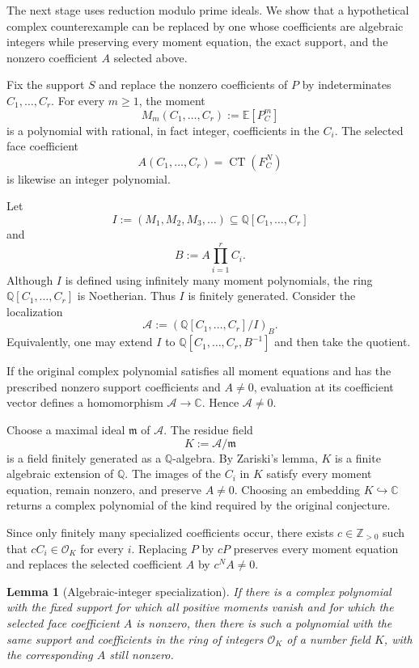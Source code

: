 \documentclass[11pt]{article}
\newtheorem{lemma}[theorem]{Lemma}
\theoremstyle{remark}
\newcommand{\E}{\mathbb E}
\newcommand{\C}{\mathbb C}
\newcommand{\Q}{\mathbb Q}
\newcommand{\Z}{\mathbb Z}
\newcommand{\CT}{\operatorname{CT}}
\begin{document}
The next stage uses reduction modulo prime ideals. We show that a hypothetical complex counterexample can be replaced by one whose coefficients are algebraic integers while preserving every moment equation, the exact support, and the nonzero coefficient $A$ selected above.

Fix the support $S$ and replace the nonzero coefficients of $P$ by indeterminates $C_1,\ldots,C_r$. For every $m\ge1$, the moment
\[
M_m(C_1,\ldots,C_r):=\E[P_C^m]
\]
is a polynomial with rational, in fact integer, coefficients in the $C_i$. The selected face coefficient
\[
A(C_1,\ldots,C_r)=\CT(F_C^N)
\]
is likewise an integer polynomial.

Let
\[
I:=(M_1,M_2,M_3,\ldots)
\subseteq
\Q[C_1,\ldots,C_r]
\]
and
\[
B:=A\prod_{i=1}^r C_i.
\]
Although $I$ is defined using infinitely many moment polynomials, the ring $\Q[C_1,\ldots,C_r]$ is Noetherian. Thus $I$ is finitely generated. Consider the localization
\begin{equation}\label{eq:localization}
\mathcal A
:=
\left(\Q[C_1,\ldots,C_r]/I\right)_B.
\end{equation}
Equivalently, one may extend $I$ to $\Q[C_1,\ldots,C_r,B^{-1}]$ and then take the quotient.

If the original complex polynomial satisfies all moment equations and has the prescribed nonzero support coefficients and $A\ne0$, evaluation at its coefficient vector defines a homomorphism $\mathcal A\to\C$. Hence $\mathcal A\ne0$.

Choose a maximal ideal $\mathfrak m$ of $\mathcal A$. The residue field
\[
K:=\mathcal A/\mathfrak m
\]
is a field finitely generated as a $\Q$-algebra. By Zariski's lemma, $K$ is a finite algebraic extension of $\Q$. The images of the $C_i$ in $K$ satisfy every moment equation, remain nonzero, and preserve $A\ne0$. Choosing an embedding $K\hookrightarrow\C$ returns a complex polynomial of the kind required by the original conjecture.

Since only finitely many specialized coefficients occur, there exists $c\in\Z_{>0}$ such that $cC_i\in\mathcal O_K$ for every $i$. Replacing $P$ by $cP$ preserves every moment equation and replaces the selected coefficient $A$ by $c^N A\ne0$.

\begin{lemma}[Algebraic-integer specialization]\label{lem:specialization}
If there is a complex polynomial with the fixed support for which all positive moments vanish and for which the selected face coefficient $A$ is nonzero, then there is such a polynomial with the same support and coefficients in the ring of integers $\mathcal O_K$ of a number field $K$, with the corresponding $A$ still nonzero.
\end{lemma}
\end{document}
